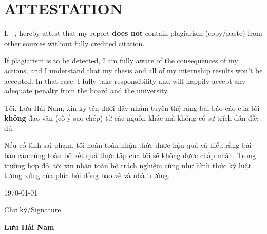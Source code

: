 \chapter*{ATTESTATION}
\noindent\hrulefill
\vspace{1cm}
    I,  \FirstName~\LastName, hereby attest that my report \textbf{does not} contain plagiarism (copy/paste) from other sources without fully credited citation. 

\vspace{0.5cm}

If plagiarism is to be detected, I am fully aware of the consequences of my actions, and I understand that my thesis and all of my internship results won’t be accepted. In that case, I fully take responsibility and will happily accept any adequate penalty from the board and the university. 



\vspace{1cm}

\noindent\hrulefill

\vspace{1cm}

\begin{otherlanguage}{vietnamese}
Tôi, Lưu Hải Nam, xin ký tên dưới đây nhằm tuyên thệ rằng bài báo cáo của tôi \textbf{không} đạo văn (cố ý sao chép) từ các nguồn khác mà không có sự trích dẫn đầy đủ.

\vspace{0.5cm}

Nếu cố tình sai phạm, tôi hoàn toàn nhận thức được hậu quả và  hiểu rằng bài báo cáo cùng toàn bộ kết quả thực tập của tôi sẽ không được chấp nhận.
Trong trường hợp đó, tôi xin nhận toàn bộ trách nghiệm cũng như hình thức kỷ luật tương xứng  của phía hội đồng bảo vệ và nhà trường.

\begin{flushright}
\vspace{1cm}

\rightskip=20pt\relax \today

\rightskip=45pt\relax Chữ ký/Signature

\vspace{4cm}

\rightskip=-15pt\relax 
\rightskip=40pt\relax \textbf{Lưu Hải Nam}
\end{flushright}

\vspace{3cm}
\end{otherlanguage}